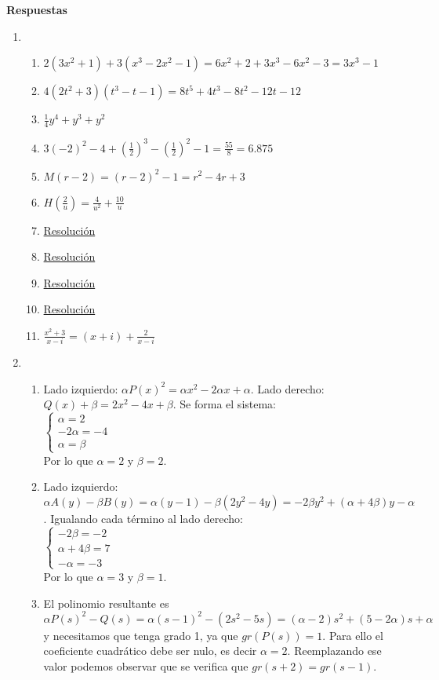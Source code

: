 \documentclass[a4paper]{article}
\newcommand{\exercise}{\item}
\newcommand{\SEL}[1]{\left\{\begin{matrix} #1 \end{matrix}\right.}
\newcommand{\df}[2]{\displaystyle\frac{#1}{#2}}
\begin{document}
\vspace{20pt} 
 \textbf{Respuestas}\begin{enumerate}\exercise\begin{enumerate} [label=(\alph*)]		\item $2(3x^2+1)+3(x^3-2x^2-1)=6x^2+2+3x^3-6x^2-3=3x^3-1$
		\item $4(2t^2+3)(t^3-t-1)=8t^5+4t^3-8t^2-12t-12$ 
		\item $\df{1}{4}y^4+y^3+y^2$
		\item $3(-2)^2-4+\left(\df{1}{2}\right)^3-\left(\df{1}{2}\right)^2-1=\df{55}{8} = 6.875$
		\item $M(r-2)=(r-2)^2-1=r^2-4r+3$
		\item $H\left(\df{2}{u}\right)=\df{4}{u^2}+\df{10}{u}$
		\item \href{https://youtu.be/DWDi7BKAKbc}{Resolución}
		\item \href{https://youtu.be/bfCWsvZfFq0}{Resolución}
		\item \href{https://youtu.be/W3HcTD4IC94}{Resolución}
		\item \href{https://youtu.be/0Dw3MAwrA34}{Resolución}
		\item $\df{x^2+3}{x-i}=(x+i)+\df{2}{x-i}$
\end{enumerate}\exercise\begin{enumerate} [label=(\alph*)]		\item Lado izquierdo: $\alpha P(x)^2= \alpha x^2-2 \alpha x+ \alpha$. Lado derecho: $Q(x) +\beta= 2x^2-4x+\beta$. Se forma el sistema: \\ $\SEL{\alpha=2 \\ -2\alpha = -4 \\ \alpha= \beta}$ \\ Por lo que $\alpha=2$ y $\beta=2$.
		\item Lado izquierdo: $\alpha A(y)-\beta B(y) = \alpha (y-1)- \beta (2y^2-4y)= -2\beta y^2 + (\alpha+4\beta) y - \alpha$. Igualando cada término al lado derecho: \\  $\SEL{-2\beta =-2 \\ \alpha+4\beta=7 \\ -\alpha=-3}$ \\ Por lo que $\alpha=3$ y $\beta=1$.
		\item El polinomio resultante es $\alpha P(s)^2 - Q(s)= \alpha (s-1)^2 - (2s^2-5s)= (\alpha-2) s^2 + (5-2\alpha) s + \alpha$ y necesitamos que tenga grado 1, ya que $gr\left(P(s)\right)=1$. Para ello el coeficiente cuadrático debe ser nulo, es decir $\alpha=2$. Reemplazando ese valor podemos observar que se verifica que $gr(s+2)=gr(s-1)$.

\end{enumerate}
\end{enumerate}
\end{document}
